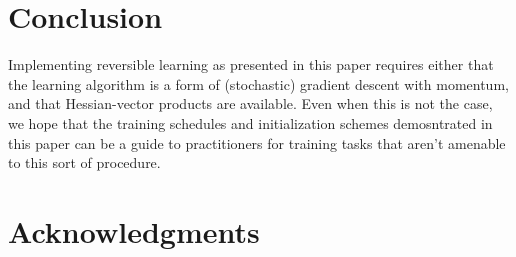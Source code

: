 \documentclass{article}
\begin{document}
\section{Conclusion}

Implementing reversible learning as presented in this paper requires either that the learning algorithm is a form of (stochastic) gradient descent with momentum, and that Hessian-vector products are available.
Even when this is not the case, we hope that the training schedules and initialization schemes demosntrated in this paper can be a guide to practitioners for training tasks that aren't amenable to this sort of procedure.

\section*{Acknowledgments} 




\end{document}
